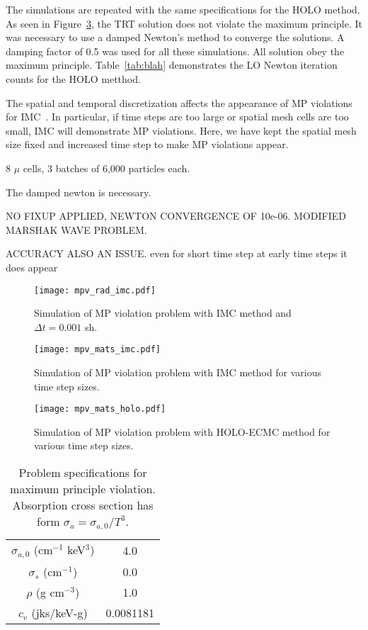 The simulations are repeated with the same specifications for the HOLO method. As seen in
Figure~\ref{fig:holo_mpv}, the TRT solution does not violate the maximum principle. It was
necessary to use a damped Newton's method to converge the solutions.  A damping factor of
0.5 was used for all these simulations.  All solution obey the maximum principle.
Table~\ref{tab:blah} demonstrates the LO Newton iteration counts for the HOLO metthod.





The spatial and temporal discretization affects the appearance of MP violations for
IMC~\cite{wollaber2013discrete}. In particular, if time steps are too large or spatial
mesh cells are too small, IMC will demonstrate MP violations.  Here, we have kept the
spatial mesh size fixed and increased time step to make MP violations appear.

8 $\mu$ cells, 3 batches of 6,000 particles each.


The damped newton is necessary.

NO FIXUP APPLIED, NEWTON CONVERGENCE OF 10e-06.  MODIFIED MARSHAK WAVE PROBLEM.

ACCURACY ALSO AN ISSUE.  even for short time step at early time steps it does appear

\begin{figure}[H]
    \centering
    \texttt{[image: mpv\_rad\_imc.pdf]}
    \caption{\label{fig:imc_mpvrad}Simulation of MP violation problem with IMC method and $\Delta t = 0.001$ sh.}
\end{figure}

\begin{figure}[H]
    \centering
    \texttt{[image: mpv\_mats\_imc.pdf]}
    \caption{\label{fig:imc_mpv}Simulation of MP violation problem with IMC method for various time step
    sizes.}
\end{figure}

\begin{figure}[H]
    \centering
    \texttt{[image: mpv\_mats\_holo.pdf]}
    \caption{\label{fig:holo_mpv}Simulation of MP violation problem with HOLO-ECMC method for various time step
    sizes.}
\end{figure}



\begin{table}[H]
        \caption{\label{tab:mpv_prob}Problem specifications for maximum principle
        violation. Absorption cross section has form $\sigma_a = \sigma_{a,0}/T^3$.}
\centering
        \begin{tabular}{|c|c|} \hline
            $\sigma_{a,0}$ (cm$^{-1}$ keV$^3$)  & 4.0  \\ 
            $\sigma_s$ (cm$^{-1}$) & 0.0 \\
            $\rho$ (g cm$^{-3}$) & 1.0  \\
            $c_v$ (jks/keV-g) & 0.0081181  \\ \hline
        \end{tabular}
\end{table}




